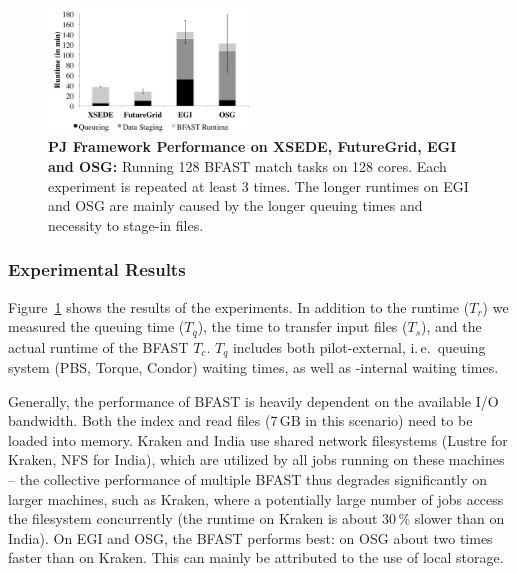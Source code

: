 \documentclass[conference]{IEEEtran}
\begin{document}

\begin{figure}[t]
 \centering
 \includegraphics[width=0.48\textwidth]{../perf/interop/128-bfast-egi-fg-xsede-osg.pdf}
 \caption{\textbf{PJ Framework Performance on XSEDE, FutureGrid, EGI and 
  OSG:} Running 128 BFAST match tasks on 128 cores. Each experiment is
  repeated at least 3 times. The longer runtimes on EGI and OSG are
  mainly caused by the longer queuing times and necessity to stage-in files.}
\label{fig:perf_perf-bfast-bj}
\end{figure}


\subsubsection*{Experimental Results}

Figure~\ref{fig:perf_perf-bfast-bj} shows the results of the
experiments. In addition to the runtime ($T_r$) we measured the
queuing time ($T_q$), the time to transfer input files ($T_s$), and
the actual runtime of the BFAST \cu $T_c$. $T_q$ includes both
pilot-external, i.\,e.\ queuing system (PBS, Torque, Condor) waiting
times, as well as \pilot-internal waiting times.

Generally, the performance of BFAST is heavily dependent on the
available I/O bandwidth. Both the index and read files (7\,GB in this
scenario) need to be loaded into memory.  Kraken and India use
shared network filesystems (Lustre for Kraken, NFS for India), which
are utilized by all jobs running on these machines -- the collective
performance of multiple BFAST \cu thus degrades significantly on
larger machines, such as Kraken, where a potentially large number of
jobs access the filesystem concurrently (the runtime on Kraken is
about 30\,\% slower than on India).  On EGI and OSG, the BFAST \cu
performs best: on OSG about two times faster than on Kraken. This can
mainly be attributed to the use of local storage.
\end{document}

